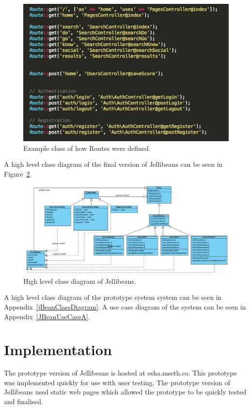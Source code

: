 \documentclass[a4paper, 11pt]{article}
\begin{document}
\begin{figure}[H]
\begin{center}
\includegraphics[scale=0.65]{routes}
\caption{Example class of how Routes were defined.}
\label{routes}
\end{center}
\end{figure}

A high level class diagram of the final version of Jellibeans can be seen in Figure~\ref{laravellClassD}.

\begin{figure}[H]
\begin{center}
\includegraphics[angle=90, scale=0.50]{laravellClassD}
\caption{High level class diagram of Jellibeans.}
\label{laravellClassD}
\end{center}
\end{figure}

A high level class diagram of the prototype system system can be seen in Appendix~\ref{jBeanClassDiagram}. A use case diagram of the system can be seen in Appendix~\ref{JBeanUseCaseA}.


\section{Implementation}
The prototype version of Jellibeans is hosted at esha.mseth.co. This prototype was implemented quickly for use with user testing. The prototype version of Jellibeans used static web pages which allowed the prototype to be quickly tested and finalised.
\end{document}

